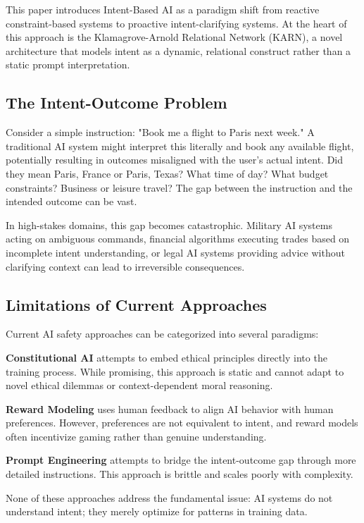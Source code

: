 \documentclass[12pt]{article}
\begin{document}
This paper introduces Intent-Based AI as a paradigm shift from reactive constraint-based systems to proactive intent-clarifying systems. At the heart of this approach is the Klamagrove-Arnold Relational Network (KARN), a novel architecture that models intent as a dynamic, relational construct rather than a static prompt interpretation.

\subsection{The Intent-Outcome Problem}

Consider a simple instruction: "Book me a flight to Paris next week." A traditional AI system might interpret this literally and book any available flight, potentially resulting in outcomes misaligned with the user's actual intent. Did they mean Paris, France or Paris, Texas? What time of day? What budget constraints? Business or leisure travel? The gap between the instruction and the intended outcome can be vast.

In high-stakes domains, this gap becomes catastrophic. Military AI systems acting on ambiguous commands, financial algorithms executing trades based on incomplete intent understanding, or legal AI systems providing advice without clarifying context can lead to irreversible consequences.

\subsection{Limitations of Current Approaches}

Current AI safety approaches can be categorized into several paradigms:

\textbf{Constitutional AI} attempts to embed ethical principles directly into the training process. While promising, this approach is static and cannot adapt to novel ethical dilemmas or context-dependent moral reasoning.

\textbf{Reward Modeling} uses human feedback to align AI behavior with human preferences. However, preferences are not equivalent to intent, and reward models often incentivize gaming rather than genuine understanding.

\textbf{Prompt Engineering} attempts to bridge the intent-outcome gap through more detailed instructions. This approach is brittle and scales poorly with complexity.

None of these approaches address the fundamental issue: AI systems do not understand intent; they merely optimize for patterns in training data.
\end{document}
